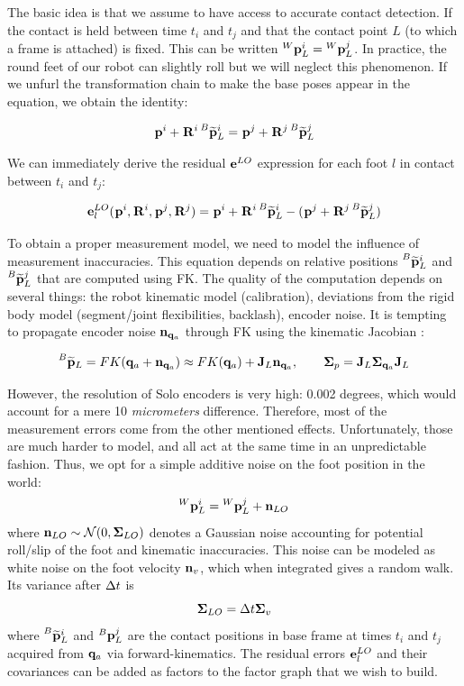 The basic idea is that we assume to have access to accurate contact detection. If the contact is held between time $t_i$ and $t_j$ and that
the contact point $L$ (to which a frame is attached) is fixed. This can be written $\prescript{W}{}{{\bf p}}_{L}^i = \prescript{W}{}{{\bf p}}_{L}^j$. 
In practice, the round feet of our robot can slightly roll but we will neglect this phenomenon. 
If we unfurl the transformation chain to make the base poses appear in the equation, we obtain the identity:

\begin{equation}
    \prescript{}{}{{\bf p}}_{}^i + \prescript{}{}{{\bf R}}_{}^i \prescript{B}{}{\widetilde{{\bf p}}}_{L}^i = \prescript{}{}{{\bf p}}_{}^j + \prescript{}{}{{\bf R}}_{}^j \prescript{B}{}{\widetilde{{\bf p}}}_{L}^j
\end{equation}

We can immediately derive the residual ${\bf e}^{LO}$ expression for each foot $l$ in contact between $t_i$ and $t_j$:

\begin{equation}
    {\bf e}^{LO}_l(\prescript{}{}{{\bf p}}_{}^i, \prescript{}{}{{\bf R}}_{}^i, \prescript{}{}{{\bf p}}_{}^j, \prescript{}{}{{\bf R}}_{}^j) = \prescript{}{}{{\bf p}}_{}^i + \prescript{}{}{{\bf R}}_{}^i \prescript{B}{}{\widetilde{{\bf p}}}_{L}^i - (\prescript{}{}{{\bf p}}_{}^j + \prescript{}{}{{\bf R}}_{}^j \prescript{B}{}{\widetilde{{\bf p}}}_{L}^j)
\end{equation}

To obtain a proper measurement model, we need to model the influence of measurement inaccuracies.
This equation depends on relative positions $\prescript{B}{}{\widetilde{{\bf p}}}_{L}^i$ and $\prescript{B}{}{\widetilde{{\bf p}}}_{L}^j$ that are computed using FK. The quality of the computation depends on several things:
the robot kinematic model (calibration), deviations from the rigid body model (\eg segment/joint flexibilities, backlash), encoder noise.
It is tempting to propagate encoder noise ${\bf n}_{{\bf q}_a}$ through FK using the kinematic Jacobian \cite{bloesch2013state, hartley2018legged}:

\begin{equation}
    \prescript{B}{}{\widetilde{{\bf p}}}_{L} = FK({\bf q}_a + {\bf n}_{{\bf q}_a}) \approx FK({\bf q}_a) + {\bf J}_L{\bf n}_{{\bf q}_a}, \quad \quad {\bm \Sigma}_{p} = {\bf J}_L {\bm \Sigma}_{{\bf q}_a} {\bf J}_L
\end{equation}

However, the resolution of Solo encoders is very high: 0.002 degrees, which would account for a mere 10 \textit{micrometers} difference.
Therefore, most of the measurement errors come from the other mentioned effects. Unfortunately, those are much harder to model, and all act at the same time
in an unpredictable fashion. Thus, we opt for a simple additive noise on the foot position in the world:
%
\begin{equation}
    \prescript{W}{}{{\bf p}}_{L}^i = \prescript{W}{}{{\bf p}}_{L}^j + {\bf n}_{LO}
\end{equation}
%
where ${\bf n}_{LO} \sim \mathcal{N}({0},{{\bm \Sigma}_{LO}})$ denotes a Gaussian noise accounting for potential roll/slip of the foot and kinematic inaccuracies.
This noise can be modeled as white noise on the foot velocity ${\bf n}_v$, which when integrated gives a random walk.  
Its variance after $\Delta t$ is 
%
\begin{equation}
    {\bm \Sigma}_{LO} = \Delta t {\bm \Sigma}_v
\end{equation}
%
where $\prescript{B}{}{\widetilde{{\bf p}}}_{L}^i$ and $\prescript{B}{}{{\bf p}}_{L}^j$ are the contact positions in base frame at times $t_i$ and $t_j$ acquired from ${\bf q}_a$ via forward-kinematics. 
The residual errors ${\bf e}^{LO}_l$ and their covariances can be added as factors to the factor graph that we wish to build.


